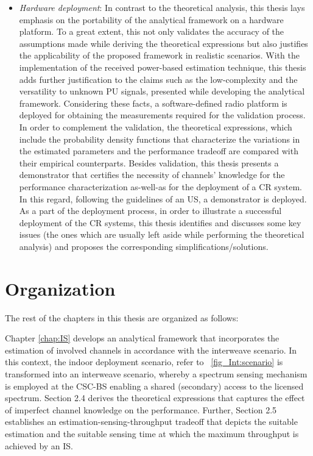 \begin{itemize}
 
\item \textit{Hardware deployment}: 
In contrast to the theoretical analysis, this thesis lays emphasis on the portability of the analytical framework on a hardware platform. To a great extent, this not only validates the accuracy of the assumptions made while deriving the theoretical expressions but also justifies the applicability of the proposed framework in realistic scenarios. With the implementation of the received power-based estimation technique, this thesis adds further justification to the claims such as the low-complexity and the versatility to unknown PU signals, presented while developing the analytical framework. Considering these facts, a software-defined radio platform is deployed for obtaining the measurements required for the validation process. In order to complement the validation, the theoretical expressions, which include the probability density functions that characterize the variations in the estimated parameters and the performance tradeoff are compared with their empirical counterparts. Besides validation, this thesis presents a demonstrator that certifies the necessity of channels' knowledge for the performance characterization as-well-as for the deployment of a CR system. In this regard, following the guidelines of an US, a demonstrator is deployed. As a part of the deployment process, %
in order to illustrate a successful deployment of the CR systems, this thesis identifies and discusses some key issues (the ones which are usually left aside while performing the theoretical analysis) and proposes the corresponding simplifications/solutions.  
\end{itemize}

\section{Organization} %

The rest of the chapters in this thesis are organized as follows:

Chapter \ref{chap:IS} develops an analytical framework that incorporates the estimation of involved channels in accordance with the interweave scenario. In this context, the indoor deployment scenario, refer to \figurename~\ref{fig_Int:scenario} is transformed into an interweave scenario, whereby a spectrum sensing mechanism is employed at the CSC-BS enabling a shared (secondary) access to the licensed spectrum. Section 2.4 derives the theoretical expressions that captures the effect of imperfect channel knowledge on the performance. Further, Section 2.5 establishes an estimation-sensing-throughput tradeoff that depicts the suitable estimation and the suitable sensing time at which the maximum throughput is achieved by an IS. 


